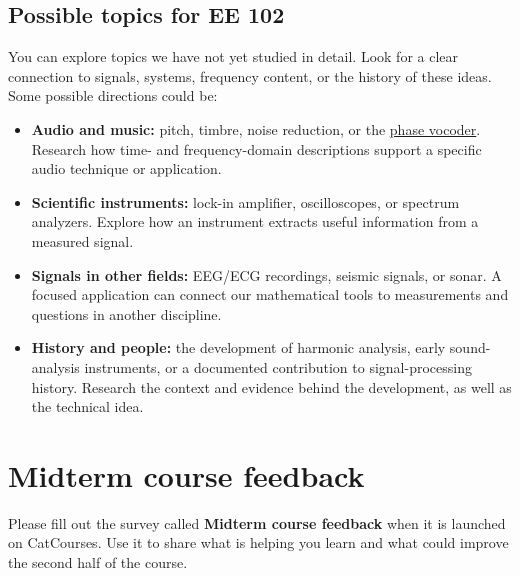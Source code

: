 \subsection{Possible topics for EE 102}
You can explore topics we have not yet studied in detail. Look for a clear
connection to signals, systems, frequency content, or the history of these
ideas. Some possible directions could be:
\begin{itemize}
    \item \textbf{Audio and music:} pitch, timbre, noise reduction, or the
    \href{https://en.wikipedia.org/wiki/Phase_vocoder}{phase vocoder}.
    Research how time- and frequency-domain descriptions support a specific
    audio technique or application.
    \item \textbf{Scientific instruments:} lock-in amplifier,
    oscilloscopes, or spectrum analyzers. Explore how an instrument extracts
    useful information from a measured signal.
    \item \textbf{Signals in other fields:} EEG/ECG recordings, seismic
    signals, or sonar. A focused application can connect our mathematical
    tools to measurements and questions in another discipline.
    \item \textbf{History and people:} the development of harmonic analysis,
    early sound-analysis instruments, or a documented contribution to
    signal-processing history. Research the context and evidence behind
    the development, as well as the technical idea.
\end{itemize}

\section{Midterm course feedback}
Please fill out the survey called \textbf{Midterm course feedback} when it
is launched on CatCourses. Use it to share what is helping you learn and
what could improve the second half of the course.
